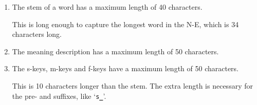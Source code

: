 \begin{enumerate}
  \item The stem of a word has a maximum length of 40 characters.
 
        This is long enough to capture the longest word in the N-E, which is
        34 characters long.

  \item The meaning description has a maximum length of 50 characters.

  \item The s-keys, m-keys and f-keys have a maximum length of 50 characters.

        This is 10 characters longer than the stem. The extra length is 
        necessary for the pre- and suffixes, like `{\tt s{\bf\_}}'.
\end{enumerate}


